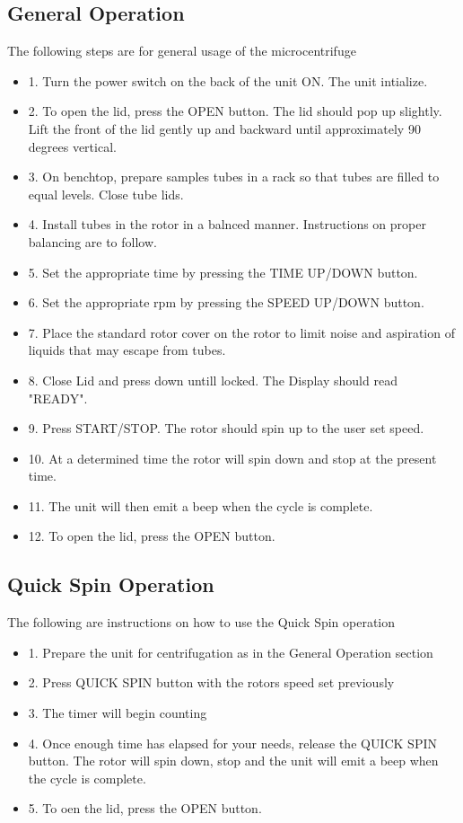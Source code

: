 \documentclass[12pt]{../SOP3_beta}
\begin{document}
\subsection*{General Operation}

\NP The following steps are for general usage of the microcentrifuge

\begin{itemize}
  \item 1. Turn the power switch on the back of the unit ON. The unit intialize.
  \item 2. To open the lid, press the OPEN button. The lid should pop up slightly. Lift the front of the lid gently up and backward until approximately 90 degrees vertical.
  \item 3. On benchtop, prepare samples tubes in a rack so that tubes are filled to equal levels. Close tube lids.
  \item 4. Install tubes in the rotor in a balnced manner. Instructions on proper balancing are to follow.
  \item 5. Set the appropriate time by pressing the TIME UP/DOWN button.
  \item 6. Set the appropriate rpm by pressing the SPEED UP/DOWN button.
  \item 7. Place the standard rotor cover on the rotor to limit noise and aspiration of liquids that may escape from tubes.
  \item 8. Close Lid and press down untill locked. The Display should read "READY".
  \item 9. Press START/STOP. The rotor should spin up to the user set speed.
  \item 10. At a determined time the rotor will spin down and stop at the present time.
  \item 11. The unit will then emit a beep when the cycle is complete.
  \item 12. To open the lid, press the OPEN button.
\end{itemize}

\subsection*{Quick Spin Operation}

\NP The following are instructions on how to use the Quick Spin operation

\begin{itemize}
  \item 1. Prepare the unit for centrifugation as in the General Operation section
  \item 2. Press QUICK SPIN button with the rotors speed set previously
  \item 3. The timer will begin counting
  \item 4. Once enough time has elapsed for your needs, release the QUICK SPIN button. The rotor will spin down, stop and the unit will emit a beep when the cycle is complete.
  \item 5. To oen the lid, press the OPEN button.
\end{itemize}
\end{document}
